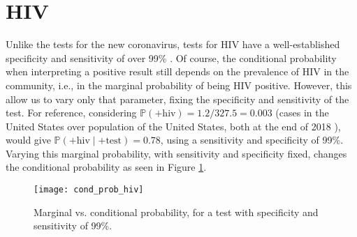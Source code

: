 \documentclass[letterpaper, 10 pt, conference]{article}
\renewcommand{\P}{\ensuremath{\mathbb{P}}}
\newcommand\tst{\ensuremath{\mathrm{test}}}
\begin{document}
\section{HIV}
Unlike the tests for the new coronavirus, tests for HIV have a well-established specificity and sensitivity of over 99\% \citep{mmwr_weekly}. Of course, the conditional probability when interpreting a positive result still depends on the prevalence of HIV in the community, i.e., in the marginal probability of being HIV positive. However, this allow us to vary only that parameter, fixing the specificity and sensitivity of the test. For reference, considering $\P(+\mathrm{hiv}) = 1.2 / 327.5 = 0.003$ (cases in the United States over population of the United States, both at the end of 2018 \citep{us_pop_clock, hiv_cdc}), would give $\P(+\mathrm{hiv} \mid +\tst) = 0.78$, using a sensitivity and specificity of 99\%. Varying this marginal probability, with sensitivity and specificity fixed, changes the conditional probability as seen in Figure \ref{fig:hiv}.

\begin{figure}
\centering
\texttt{[image: cond\_prob\_hiv]}
\caption{Marginal vs. conditional probability, for a test with specificity and sensitivity of 99\%. }
\label{fig:hiv}
\end{figure}










\end{document}
